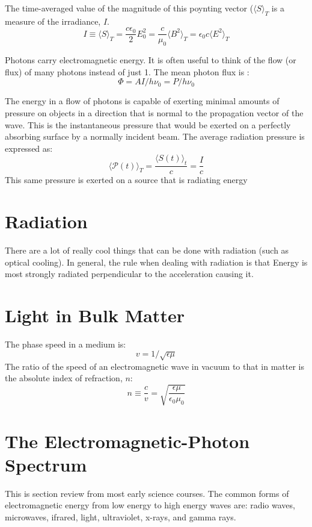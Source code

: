 \documentclass[12pt]{report}
\begin{document}
The time-averaged value of the magnitude of this poynting vector ($\langle S \rangle_T$ is a measure of the irradiance, $I$.
\begin{equation}
I \equiv \langle S \rangle _T = \frac{c\epsilon_0}{2}E_0^2 = \frac{c}{\mu_0} \langle B^2 \rangle_T = \epsilon_0 c \langle E^2 \rangle_T
\end{equation}

Photons carry electromagnetic energy. It is often useful to think of the flow (or flux) of many photons instead of just 1. The mean photon flux is :
\[\Phi = AI/h\nu_0 = P/h\nu_0\]

The energy in a flow of photons is capable of exerting minimal amounts of pressure on objects in a direction that is normal to the propagation vector of the wave. This is the instantaneous pressure that would be exerted on a perfectly absorbing surface by a normally incident beam. The average radiation pressure is expressed as:
\begin{equation}
\langle \mathcal{P}(t) \rangle_T = \frac{\langle S(t) \rangle_t}{c} = \frac{I}{c}
\end{equation}
This same pressure is exerted on a source that is radiating energy 

\section{Radiation}
There are a lot of really cool things that can be done with radiation (such as optical cooling). In general, the rule when dealing with radiation is that Energy is most strongly radiated perpendicular to the acceleration causing it. 

\section{Light in Bulk Matter}
The phase speed in a medium is:
\[v = 1/\sqrt{\epsilon\mu}\]
The ratio of the speed of an electromagnetic wave in vacuum to that in matter is the absolute index of refraction, $n$:
\begin{equation}
n \equiv \frac{c}{v} = \sqrt{\frac{\epsilon \mu}{\epsilon_0 \mu_0}}
\end{equation}

\section{The Electromagnetic-Photon Spectrum}
This is section review from most early science courses. The common forms of electromagnetic energy from low energy to high energy waves are: radio waves, microwaves, ifrared, light, ultraviolet, x-rays, and gamma rays.
\end{document}
